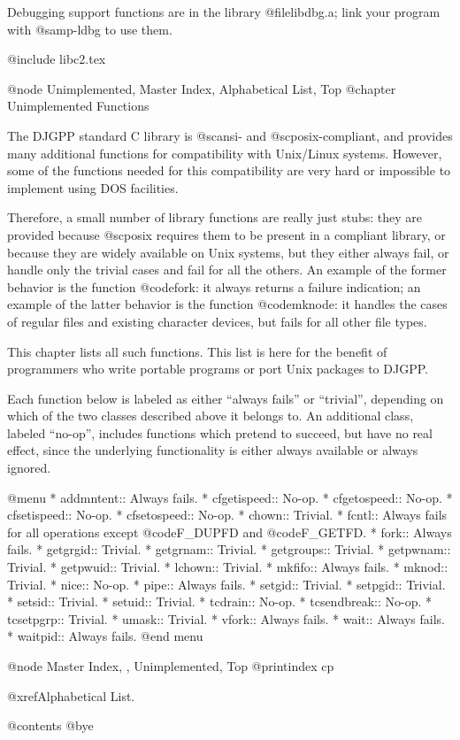Debugging support functions are in the library @file{libdbg.a}; link
your program with @samp{-ldbg} to use them.

@include libc2.tex

@node Unimplemented, Master Index, Alphabetical List, Top
@chapter Unimplemented Functions

The DJGPP standard C library is @sc{ansi}- and @sc{posix}-compliant, and
provides many additional functions for compatibility with Unix/Linux
systems.  However, some of the functions needed for this compatibility
are very hard or impossible to implement using DOS facilities.

Therefore, a small number of library functions are really just stubs:
they are provided because @sc{posix} requires them to be present in a
compliant library, or because they are widely available on Unix systems,
but they either always fail, or handle only the trivial cases and fail
for all the others.  An example of the former behavior is the function
@code{fork}: it always returns a failure indication; an example of the
latter behavior is the function @code{mknode}: it handles the cases of
regular files and existing character devices, but fails for all other
file types.

This chapter lists all such functions.  This list is here for the
benefit of programmers who write portable programs or port Unix packages
to DJGPP.

Each function below is labeled as either ``always fails'' or
``trivial'', depending on which of the two classes described above it
belongs to.  An additional class, labeled ``no-op'', includes functions
which pretend to succeed, but have no real effect, since the underlying
functionality is either always available or always ignored.

@menu
* addmntent::                Always fails.
* cfgetispeed::              No-op.
* cfgetospeed::              No-op.
* cfsetispeed::              No-op.
* cfsetospeed::              No-op.
* chown::                    Trivial.
* fcntl::                    Always fails for all operations except
                             @code{F_DUPFD} and @code{F_GETFD}.
* fork::                     Always fails.
* getgrgid::                 Trivial.
* getgrnam::                 Trivial.
* getgroups::                Trivial.
* getpwnam::                 Trivial.
* getpwuid::                 Trivial.
* lchown::                   Trivial.
* mkfifo::                   Always fails.
* mknod::                    Trivial.
* nice::                     No-op.
* pipe::                     Always fails.
* setgid::                   Trivial.
* setpgid::                  Trivial.
* setsid::                   Trivial.
* setuid::                   Trivial.
* tcdrain::                  No-op.
* tcsendbreak::              No-op.
* tcsetpgrp::                Trivial.
* umask::                    Trivial.
* vfork::                    Always fails.
* wait::                     Always fails.
* waitpid::                  Always fails.
@end menu

@node Master Index, , Unimplemented, Top
@printindex cp

@xref{Alphabetical List}.

@contents
@bye

